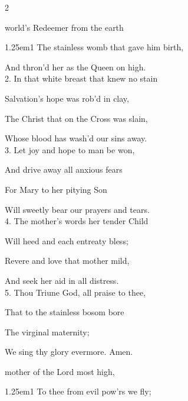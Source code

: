 \begin{paracol}{2}
\sloppy

\vspace{-1\baselineskip}

\mattinsInvitatoryHymn
{} world’s Redeemer from the earth


\begin{hangparas}{1.25em}{1}
The stainless womb that gave him birth,

And thron'd her as the Queen on high.\\

2. In that white breast that knew no stain

Salvation’s hope was rob'd in clay,

The Christ that on the Cross was slain,

Whose blood has wash'd our sins away.\\

3. Let joy and hope to man be won,

And drive away all anxious fears

For Mary to her pitying Son

Will sweetly bear our prayers and tears.\\

4. The mother’s words her tender Child

Will heed and each entreaty bless;

Revere and love that mother mild,

And seek her aid in all distress.\\

5. Thou Triune God, all praise to thee,

That to the stainless bosom bore

The virginal maternity;

We sing thy glory evermore. Amen.
\end{hangparas}

\switchcolumn

\vspace{-1\baselineskip}

\mattinsOfficeHymn
{} mother of the Lord most high,


\begin{hangparas}{1.25em}{1}
To thee from evil pow'rs we fly;


\end{hangparas}
\end{paracol}
